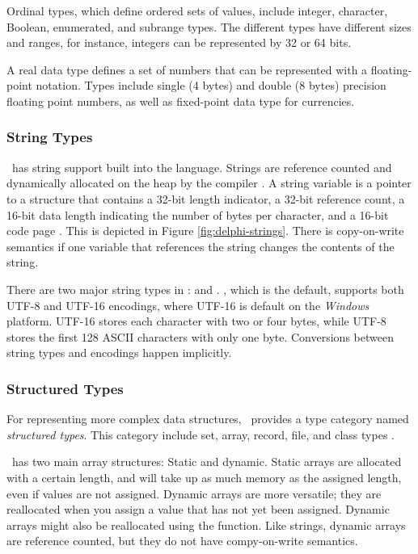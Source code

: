 Ordinal types, which define ordered sets of values, include integer, character, Boolean, enumerated, and subrange types. The different types have different sizes and ranges, for instance, integers can be represented by 32 or 64 bits.

A real data type defines a set of numbers that can be represented with a floating-point notation. Types include single (4 bytes) and double (8 bytes) precision floating point numbers, as well as fixed-point data type for currencies.

\subsubsection{String Types}
\label{ssub:String Types}
\delphi~has string support built into the language. Strings are reference counted and dynamically allocated on the heap by the compiler \cite{Wikipedia_contributors2016-jk}. A string variable is a pointer to a structure that contains a 32-bit length indicator, a 32-bit reference count, a 16-bit data length indicating the number of bytes per character, and a 16-bit code page \cite{noauthor_undated-cp}. This is depicted in Figure \ref{fig:delphi-strings}. There is copy-on-write semantics if one variable that references the string changes the contents of the string.

There are two major string types in \delphi:  and . , which is the default, supports both UTF-8 and UTF-16 encodings, where UTF-16 is default on the \textit{Windows} platform. UTF-16 stores each character with two or four bytes, while UTF-8 stores the first 128 ASCII characters with only one byte. Conversions between string types and encodings happen implicitly.

\subsubsection{Structured Types}
\label{ssub:Structured Types}
For representing more complex data structures, \delphi~provides a type category named \textit{structured types}. This category include set, array, record, file, and class types \cite{noauthor_undated-vu}.

\delphi~has two main array structures: Static and dynamic. Static arrays are allocated with a certain length, and will take up as much memory as the assigned length, even if values are not assigned. Dynamic arrays are more versatile; they are reallocated when you assign a value that has not yet been assigned. Dynamic arrays might also be reallocated using the  function. Like strings, dynamic arrays are reference counted, but they do not have compy-on-write semantics.

